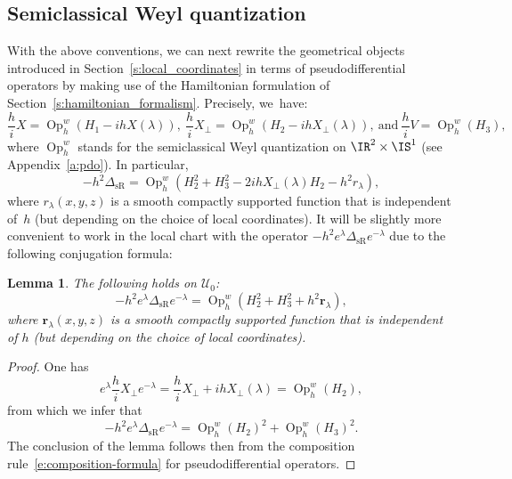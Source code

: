 \documentclass[JEP,XML,SOM,Unicode, NoEqCountersInSection,published]{cedram}
\theoremstyle{plain}
\newtheorem{lemm}[theo]{Lemma}
\theoremstyle{definition}
\theoremstyle{remark}
\newcommand{\Op}{\operatorname{Op}}
\begin{document}
\subsection{Semiclassical Weyl quantization}\label{ss:weyl-operators}

With the above conventions, we can next rewrite the geometrical objects introduced in Section~\ref{s:local_coordinates} in terms of pseudodifferential operators by making use of the Hamiltonian formulation of Section~\ref{s:hamiltonian_formalism}. Precisely, we~have:
\[
\frac{h}{i}X=\Op_h^w(H_1-ih X(\lambda)),\ \frac{h}{i}X_\perp=\Op_h^w(H_2-ihX_\perp(\lambda)),\ \text{and}\ \frac{h}{i}V=\Op_h^w(H_3),
\]
where $\Op_h^w$ stands for the semiclassical Weyl quantization on $\IR^2\times\IS^1$ (see Appendix~\ref{a:pdo}). In particular,
\begin{equation}%
-h^2\Delta_{\text{sR}}=\Op^w_h(H_2^2+H_3^2-2ih X_\perp(\lambda)H_2-h^2r_\lambda),
\end{equation}
where $r_\lambda(x,y,z)$ is a smooth compactly supported function that is independent of~$h$ (but depending on the choice of local coordinates). It will be slightly more convenient to work in the local chart with the operator $-h^2e^{\lambda}\Delta_{\text{sR}}e^{-\lambda}$ due to the following conjugation formula:

\begin{lemm}
The following holds on $\mathcal{U}_0$:
\begin{equation}%
-h^2e^{\lambda}\Delta_{\operatorname{sR}}e^{-\lambda}=\Op_h^w(H_2^2+H_3^2+h^2\boldsymbol{r}_\lambda),
\end{equation}
where $\boldsymbol{r}_\lambda(x,y,z)$ is a smooth compactly supported function that is independent of $h$ (but depending on the choice of local coordinates).
\end{lemm}

\begin{proof} One has
\[
e^{\lambda}\frac{h}{i}X_\perp e^{-\lambda}=\frac{h}{i}X_\perp+ihX_\perp(\lambda)=\Op_h^w(H_2),
\]
from which we infer that
\[
-h^2e^{\lambda}\Delta_{\operatorname{sR}}e^{-\lambda}=\Op_h^w(H_2)^2+\Op_h^w(H_3)^2.
\]
The conclusion of the lemma follows then from the composition rule~\eqref{e:composition-formula} for pseudodifferential operators.
\end{proof}
\end{document}
